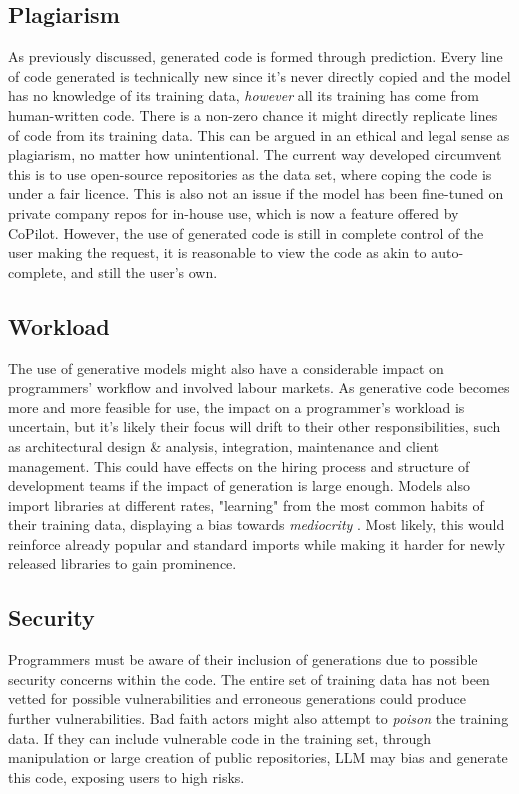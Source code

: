 \documentclass[manuscript,screen,review,sigconf]{acmart}
\begin{document}
\subsection{Plagiarism}
As previously discussed, generated code is formed through prediction. Every line of code generated is technically new since it's never directly copied and the model has no knowledge of its training data, \textit{however} all its training has come from human-written code. There is a non-zero chance it might directly replicate lines of code from its training data. This can be argued in an ethical and legal sense as plagiarism, no matter how unintentional. The current way developed circumvent this is to use open-source repositories as the data set, where coping the code is under a fair licence. This is also not an issue if the model has been fine-tuned on private company repos for in-house use, which is now a feature offered by CoPilot. However, the use of generated code is still in complete control of the user making the request, it is reasonable to view the code as akin to auto-complete, and still the user's own.
\subsection{Workload}
The use of generative models might also have a considerable impact on programmers' workflow and involved labour markets. As generative code becomes more and more feasible for use, the impact on a programmer's workload is uncertain, but it's likely their focus will drift to their other responsibilities, such as architectural design \& analysis, integration, maintenance and client management. This could have effects on the hiring process and structure of development teams if the impact of generation is large enough. Models also import libraries at different rates, "learning" from the most common habits of their training data, displaying a bias towards \textit{mediocrity }. Most likely, this would reinforce already popular and standard imports while making it harder for newly released libraries to gain prominence.
\subsection{Security}
Programmers must be aware of their inclusion of generations due to possible security concerns within the code. The entire set of training data has not been vetted for possible vulnerabilities and erroneous generations could produce further vulnerabilities. Bad faith actors might also attempt to \textit{poison} the training data. If they can include vulnerable code in the training set, through manipulation or large creation of public repositories, LLM may bias and generate this code, exposing users to high risks.
\end{document}
